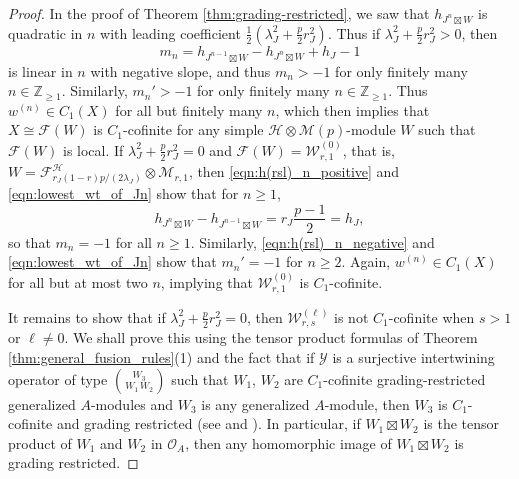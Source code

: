 \documentclass[11pt, reqno]{amsart}
\theoremstyle{definition}\newtheorem{defi}[thm]{Definition}
\theoremstyle{definition}\newtheorem{rem}[thm]{Remark}
\theoremstyle{definition}\newtheorem{exam}[thm]{Example}
\theoremstyle{definition}\newtheorem{assum}[thm]{Assumption}
\newcommand{\cH}{\mathcal{H}}
\newcommand{\cY}{\mathcal{Y}}
\newcommand{\cM}{\mathcal{M}}
\newcommand{\cF}{\mathcal{F}}
\newcommand{\cO}{\mathcal{O}}
\newcommand{\cW}{\mathcal{W}}
\newcommand{\ZZ}{\mathbb{Z}}
\newcommand{\tens}{\boxtimes}
\begin{document}
\begin{proof}
 In the proof of Theorem \ref{thm:grading-restricted}, we saw that $h_{J^n\tens W}$ is quadratic in $n$ with leading coefficient $\frac{1}{2}(\lambda_J^2+\frac{p}{2}r_J^2)$. Thus if $\lambda_J^2+\frac{p}{2}r_J^2>0$, then
 \begin{equation*}
 m_n= h_{J^{n-1}\tens W}-h_{J^n\tens W}+h_J-1
 \end{equation*}
 is linear in $n$ with negative slope, and thus $m_n>-1$ for only finitely many $n\in\ZZ_{\geq 1}$. Similarly, $m_n'>-1$ for only finitely many $n\in\ZZ_{\geq 1}$. Thus $w^{(n)}\in C_1(X)$ for all but finitely many $n$, which then implies that $X\cong\cF(W)$ is $C_1$-cofinite for any simple $\cH\otimes\cM(p)$-module $W$ such that $\cF(W)$ is local. If $\lambda_J^2+\frac{p}{2}r_J^2=0$  and $\cF(W)=\cW_{r,1}^{(0)}$, that is, $W=\cF^\cH_{r_J(1-r)p/(2\lambda_J)}\otimes\cM_{r,1}$, then \eqref{eqn:h(rsl)_n_positive} and \eqref{eqn:lowest_wt_of_Jn} show that for $n\geq 1$,
 \begin{equation*}
 h_{J^n\tens W}-h_{J^{n-1}\tens W} = r_J\frac{p-1}{2} =h_J, 
 \end{equation*}
 so that $m_n=-1$ for all $n\geq 1$. Similarly, \eqref{eqn:h(rsl)_n_negative} and \eqref{eqn:lowest_wt_of_Jn} show that $m_n'=-1$ for $n\geq 2$. Again, $w^{(n)}\in C_1(X)$ for all but at most two $n$, implying that $\cW_{r,1}^{(0)}$ is $C_1$-cofinite.
 
 
It remains to show that if $\lambda_J^2+\frac{p}{2}r_J^2=0$, then $\cW_{r,s}^{(\ell)}$ is not $C_1$-cofinite when $s>1$ or $\ell\neq 0$. We shall prove this using the tensor product formulas of Theorem \ref{thm:general_fusion_rules}(1) and the fact that if $\cY$ is a surjective intertwining operator of type $\binom{W_3}{W_1\,W_2}$ such that $W_1$, $W_2$ are $C_1$-cofinite grading-restricted generalized $A$-modules and $W_3$ is any generalized $A$-module, then $W_3$ is $C_1$-cofinite and grading restricted (see \cite[Key Theorem]{Miy} and \cite[Corollary 2.12]{CMY-completions}). In particular, if $W_1\tens W_2$ is the tensor product of $W_1$ and $W_2$ in $\cO_A$, then any homomorphic image of $W_1\tens W_2$ is grading restricted.


\end{proof}
\end{document}
